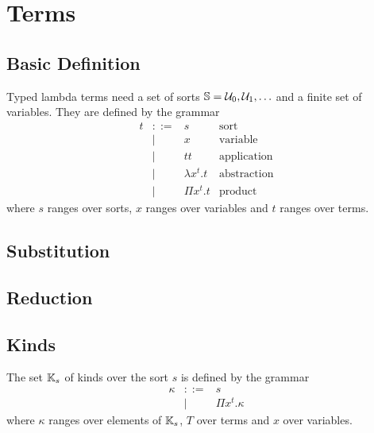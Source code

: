\section{Terms}

\subsection{Basic Definition}

\begin{definition}
  Typed lambda terms need a set of sorts $\mathbb{S} = {{\cal U}_0, {\cal U}_1, \ldots}$ and
  a finite set of variables. They are defined by the grammar
  $$
  \begin{array}{llll}
    t &::=& s                 &\text{sort}
    \\
      &\mid& x                &\text{variable}
    \\
      &\mid& t t              &\text{application}
    \\
      &\mid& \lambda x^t.t    &\text{abstraction}
    \\
      &\mid& \Pi x^t.t        &\text{product}
  \end{array}
  $$
  where $s$ ranges over sorts, $x$ ranges over variables and $t$ ranges over
  terms.


\end{definition}



\subsection{Substitution}

\subsection{Reduction}

\subsection{Kinds}

\begin{definition}
  The set $\mathbb{K}_s$ of kinds over the sort $s$ is defined by the grammar
  $$
  \begin{array}{lll}
    \kappa &::=& s
    \\
           &\mid& \Pi x^t. \kappa
  \end{array}
  $$
  where $\kappa$ ranges over elements of $\mathbb{K}_s$, $T$ over terms and $x$
  over variables.
\end{definition}


